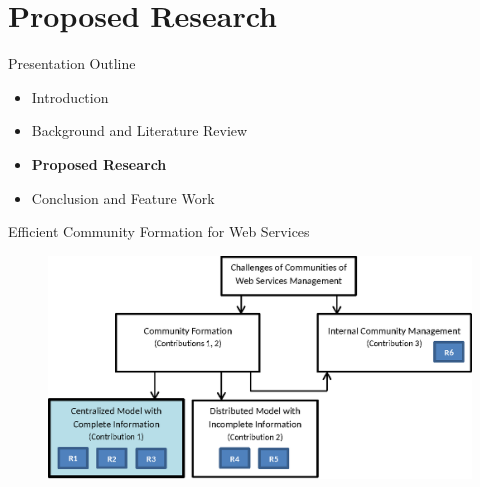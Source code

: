 \documentclass{beamer}
\begin{document}


\section{Proposed Research}
\begin{frame}{Presentation Outline}
    \begin{itemize}
     	\itemsep=.5cm
    	\item Introduction
    	\item Background and Literature Review
    	\item {\bf Proposed Research}
    	\item Conclusion and Feature Work
    \end{itemize}
\end{frame}


\begin{frame}{Efficient Community Formation for Web Services}
    \begin{figure}[htbp]
        \centering
        \includegraphics[width=0.9 \columnwidth]{figures/model_c1.eps}
    \end{figure}
\end{frame}
\end{document}
